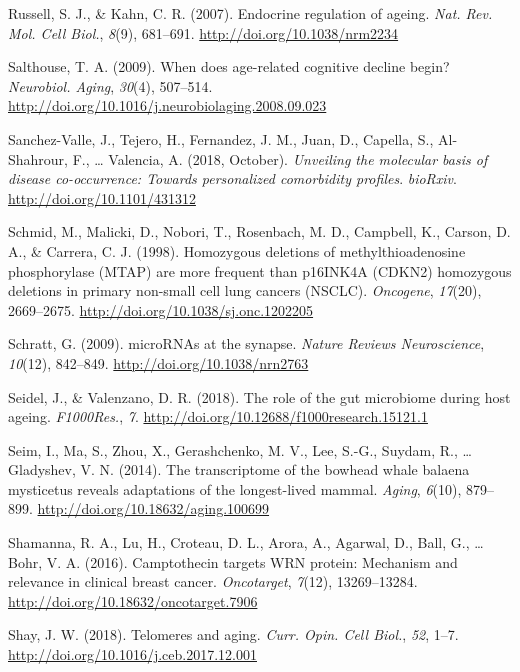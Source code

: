 \documentclass[12pt,twoside]{unicam}
\begin{document}
\begin{cslreferences}
\leavevmode\hypertarget{ref-Russell2007}{}%
Russell, S. J., \& Kahn, C. R. (2007). Endocrine regulation of ageing. \emph{Nat. Rev. Mol. Cell Biol.}, \emph{8}(9), 681--691. \url{http://doi.org/10.1038/nrm2234}

\leavevmode\hypertarget{ref-Salthouse2009}{}%
Salthouse, T. A. (2009). When does age-related cognitive decline begin? \emph{Neurobiol. Aging}, \emph{30}(4), 507--514. \url{http://doi.org/10.1016/j.neurobiolaging.2008.09.023}

\leavevmode\hypertarget{ref-Sanchez-Valle2018}{}%
Sanchez-Valle, J., Tejero, H., Fernandez, J. M., Juan, D., Capella, S., Al-Shahrour, F., \ldots{} Valencia, A. (2018, October). \emph{Unveiling the molecular basis of disease co-occurrence: Towards personalized comorbidity profiles}. \emph{bioRxiv}. \url{http://doi.org/10.1101/431312}

\leavevmode\hypertarget{ref-Schmid1998}{}%
Schmid, M., Malicki, D., Nobori, T., Rosenbach, M. D., Campbell, K., Carson, D. A., \& Carrera, C. J. (1998). Homozygous deletions of methylthioadenosine phosphorylase (MTAP) are more frequent than p16INK4A (CDKN2) homozygous deletions in primary non-small cell lung cancers (NSCLC). \emph{Oncogene}, \emph{17}(20), 2669--2675. \url{http://doi.org/10.1038/sj.onc.1202205}

\leavevmode\hypertarget{ref-Schratt2009}{}%
Schratt, G. (2009). microRNAs at the synapse. \emph{Nature Reviews Neuroscience}, \emph{10}(12), 842--849. \url{http://doi.org/10.1038/nrn2763}

\leavevmode\hypertarget{ref-Seidel2018}{}%
Seidel, J., \& Valenzano, D. R. (2018). The role of the gut microbiome during host ageing. \emph{F1000Res.}, \emph{7}. \url{http://doi.org/10.12688/f1000research.15121.1}

\leavevmode\hypertarget{ref-Seim2014}{}%
Seim, I., Ma, S., Zhou, X., Gerashchenko, M. V., Lee, S.-G., Suydam, R., \ldots{} Gladyshev, V. N. (2014). The transcriptome of the bowhead whale balaena mysticetus reveals adaptations of the longest-lived mammal. \emph{Aging}, \emph{6}(10), 879--899. \url{http://doi.org/10.18632/aging.100699}

\leavevmode\hypertarget{ref-Shamanna2016}{}%
Shamanna, R. A., Lu, H., Croteau, D. L., Arora, A., Agarwal, D., Ball, G., \ldots{} Bohr, V. A. (2016). Camptothecin targets WRN protein: Mechanism and relevance in clinical breast cancer. \emph{Oncotarget}, \emph{7}(12), 13269--13284. \url{http://doi.org/10.18632/oncotarget.7906}

\leavevmode\hypertarget{ref-Shay2018}{}%
Shay, J. W. (2018). Telomeres and aging. \emph{Curr. Opin. Cell Biol.}, \emph{52}, 1--7. \url{http://doi.org/10.1016/j.ceb.2017.12.001}


\end{cslreferences}
\end{document}
